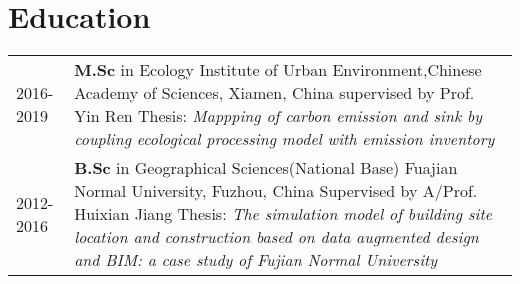 \section*{Education}
\begin{tabular}{p{} p{}}
2016-2019 & \textbf{M.Sc} in Ecology \newline
       Institute of Urban Environment,Chinese Academy of Sciences, Xiamen, China \newline 
       supervised by Prof. Yin Ren \newline
       Thesis: \textit{Mappping of carbon emission and sink by coupling ecological \newline
       processing model with emission inventory} \\

2012-2016 & \textbf{B.Sc} in Geographical Sciences(National Base) \newline
       Fuajian Normal University, Fuzhou, China \newline
       Supervised by A/Prof. Huixian Jiang \newline
       Thesis: \textit{The simulation model of building site location and construction \newline
       based on data augmented design and BIM: a case study of \newline
       Fujian Normal University }
\end{tabular}
